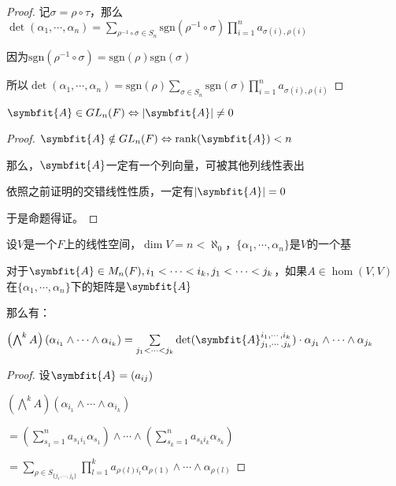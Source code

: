 \documentclass[12pt, a4paper, oneside, UTF8]{ctexbook}
\begin{document}
\begin{para}{0}
\begin{proof}
						记$\sigma =\rho \circ \tau $，那么$\det(\alpha_1,\cdots,\alpha_n)=\sum_{\rho^{-1} \circ \sigma  \in S_n} \text{sgn}(\rho^{-1} \circ \sigma) \prod_{i=1}^n a_{\sigma (i),\rho (i)}$

						因为$\text{sgn}(\rho^{-1} \circ \sigma)=\text{sgn}(\rho )\text{sgn}(\sigma )$

						所以$\det(\alpha_1,\cdots,\alpha_n)=\text{sgn}(\rho )\sum_{\sigma \in S_n} \text{sgn}(\sigma) \prod_{i=1}^n a_{\sigma(i),\rho (i)}$
					\end{proof}

					\begin{proposition}
						$\symbfit{A} \in GL_n(F) \Leftrightarrow |\symbfit{A}|\neq 0$
					\end{proposition}
					\begin{proof}
						$\symbfit{A} \notin GL_n(F) \Leftrightarrow \rank(\symbfit{A})< n$

						那么，$\symbfit{A}$一定有一个列向量，可被其他列线性表出

						依照之前证明的交错线性性质，一定有$|\symbfit{A}|=0$

						于是命题得证。
					\end{proof}
					\begin{lemma}{}{}
						设$V$是一个$F$上的线性空间，$\dim V = n < \aleph_0$，$\{\alpha_1,\cdots,\alpha_n\}$是$V$的一个基

						对于$\symbfit{A} \in M_n(F),i_1 < \cdots < i_k,j_1 < \cdots < j_k$，如果$A \in \hom(V,V)$在$\{\alpha_1,\cdots,\alpha_n\}$下的矩阵是$\symbfit{A}$
						
						那么有：

						$\left(\bigwedge^{k} A\right)(\alpha_{i_1}\wedge \cdots \wedge \alpha_{i_k})=\sum\limits_{j_1 < \cdots < j_k}\det(\symbfit{A}_{j_1,\cdots,j_k}^{i_1,\cdots,i_k})\cdot \alpha_{j_1} \wedge \cdots \wedge \alpha_{j_k}$
					\end{lemma}
					\begin{proof}
						设$\symbfit{A}=(a_{ij})$

						$\left(\bigwedge^{k} A\right)(\alpha_{i_1}\wedge \cdots \wedge \alpha_{i_k})$

						$=\left(\sum\limits_{s_1=1}^{n} a_{s_1i_1}\alpha_{s_1}\right)\wedge \cdots \wedge \left(\sum\limits_{s_k=1}^{n} a_{s_ki_k}\alpha_{s_k}\right)$

						$=\sum\limits_{\rho \in S_{\{j_1,\cdots,j_k\}}} \prod_{l=1}^{k} a_{\rho(l)i_l} \alpha_{\rho(1)}\wedge \cdots \wedge \alpha_{\rho(l)}$


\end{proof}
\end{para}
\end{document}
